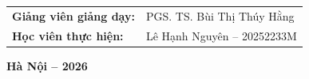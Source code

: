 \begin{titlepage}
    \vspace{2.0cm}
    
    \begin{flushleft}
        \hspace{2.5cm} 
        \begin{tabular}{ll}
            \fontsize{12}{14}\selectfont\textbf{Giảng viên giảng dạy:} & \fontsize{12}{14}\selectfont PGS. TS. Bùi Thị Thúy Hằng \\
            \fontsize{12}{14}\selectfont\textbf{Học viên thực hiện:} & \fontsize{12}{14}\selectfont Lê Hạnh Nguyên -- 20252233M
        \end{tabular}
    \end{flushleft}
    
    \vfill
    
    {\fontsize{12}{14}\selectfont\textbf{Hà Nội -- 2026}\\}
    \vspace*{0.4cm}
    
\end{titlepage}

